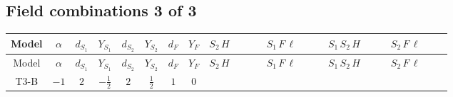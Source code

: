 \documentclass[8pt]{article}
\begin{document}
\begin{landscape}
\subsection*{Field combinations 3 of 3}
\begin{longtable}{@{}cccccccc >{\raggedright\arraybackslash}p{0.18\linewidth} >{\raggedright\arraybackslash}p{0.18\linewidth} >{\raggedright\arraybackslash}p{0.18\linewidth} >{\raggedright\arraybackslash}p{0.18\linewidth}@{}}
\toprule
Model & $\alpha$ & $d_{S_1}$ & $Y_{S_1}$ & $d_{S_2}$ & $Y_{S_2}$ & $d_F$ & $Y_F$ & $S_2\,H$ & $S_1\,F\,\ell$ & $S_1\,S_2\,H$ & $S_2\,F\,\ell$ \\
\midrule
\endfirsthead
\toprule
Model & $\alpha$ & $d_{S_1}$ & $Y_{S_1}$ & $d_{S_2}$ & $Y_{S_2}$ & $d_F$ & $Y_F$ & $S_2\,H$ & $S_1\,F\,\ell$ & $S_1\,S_2\,H$ & $S_2\,F\,\ell$ \\
\midrule
\endhead
T3-B & $-1$ & $2$ & $-\frac{1}{2}$ & $2$ & $\frac{1}{2}$ & $1$ & $0$ & \scriptsize\adjustbox{max width=\linewidth}{$\begin{gathered} +\text{lambdaH2Inv1} H_{a_2} \text{NewScalar2}_{j_2} \text{T3HiggsPortal2CGInv1}_{a_1,a_2,j_1,j_2} H_{a_1}{}^{\dagger } \text{NewScalar2}_{j_1}{}^{\dagger } \\ +\text{lambdaH2Inv2} H_{a_2} \text{NewScalar2}_{j_2} \text{T3HiggsPortal2CGInv2}_{a_1,a_2,j_1,j_2} H_{a_1}{}^{\dagger } \text{NewScalar2}_{j_1}{}^{\dagger }\end{gathered}$} & \scriptsize\adjustbox{max width=\linewidth}{$\begin{gathered} +\overline{\ell _{a_1,i_1}}\, P_R\, N_{r_1} \text{NewScalar1}_{j_1} \text{T3Y1CG}_{a_1,j_1} y_{1,i_1,r_1} \\ +\overline{y_{1,i_1,r_1}} N_{r_1}{}^T\, C\, P_L\, \ell _{a_1,i_1} \overline{\text{T3Y1CG}}_{a_1,j_1} \text{NewScalar1}_{j_1}{}^{\dagger }\end{gathered}$} & \scriptsize\adjustbox{max width=\linewidth}{$\begin{gathered} +\overline{\lambda _{\text{T3}}} \text{NewScalar2}_{j_2} \overline{\text{T3MixCG}}_{a_1,a_2,j_1,j_2} H_{a_1}{}^{\dagger } H_{a_2}{}^{\dagger } \text{NewScalar1}_{j_1}{}^{\dagger } \\ +H_{a_1} H_{a_2} \text{NewScalar1}_{j_2} \text{T3MixCG}_{a_1,a_2,j_2,j_1} \lambda _{\text{T3}} \text{NewScalar2}_{j_1}{}^{\dagger }\end{gathered}$} & \scriptsize\adjustbox{max width=\linewidth}{$\begin{gathered} +\overline{y_{2,i_1,r_1}} N_{r_1}{}^T\, C\, P_L\, \ell _{a_1,i_1} \text{NewScalar2}_{j_1} \overline{\text{T3Y2CG}}_{a_1,j_1} \\ +\overline{\ell _{a_1,i_1}}\, P_R\, N_{r_1} \text{T3Y2CG}_{a_1,j_1} y_{2,i_1,r_1} \text{NewScalar2}_{j_1}{}^{\dagger }\end{gathered}$} \\

\end{longtable}
\end{landscape}
\end{document}
